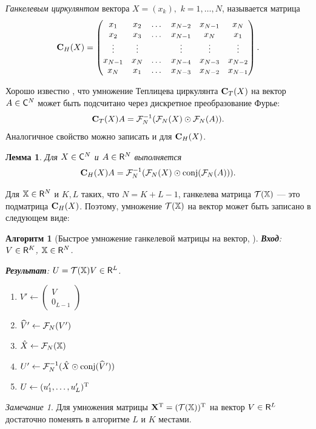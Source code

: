 \documentclass[12pt, specialist, subf,href,colorlinks=true,substylefile = spbu.rtx]{disser}
\newtheorem{algorithm}{Алгоритм}
\newtheorem{lemma}{Лемма}
\theoremstyle{remark}
\newtheorem{remark}{Замечание}
\theoremstyle{definition}
\begin{document}
\emph{Ганкелевым циркулянтом} вектора $X=(x_k),$ $k = 1, \ldots, N$, называется матрица
\begin{equation*}
\mathbf{C}_H(X) = \begin{pmatrix}
x_1 & x_2 & \dots & x_{N-2} & x_{N-1} & x_N \\ 
x_2 & x_3 & \dots & x_{N-1} & x_N & x_1 \\ 
\vdots & \vdots &  & \vdots  & \vdots & \vdots \\ 
x_{N-1} & x_N & \dots & x_{N-4} & x_{N-3} & x_{N-2} \\ 
x_N & x_1 & \dots & x_{N-3} & x_{N-2} & x_{N-1}
\end{pmatrix}.
\end{equation*}

Хорошо известно \cite{Korobeynikov2010}, что умножение Теплицева циркулянта $\mathbf{C}_T(X)$ на вектор $A \in \mathsf{C}^N$ может быть подсчитано через дискретное преобразование Фурье:
\begin{equation*}
\mathbf{C}_T(X) A = \mathcal{F}_N^{-1}(\mathcal{F}_N(X) \odot \mathcal{F}_N(A)).
\end{equation*}
Аналогичное свойство можно записать и для $\mathbf{C}_H(X)$.
\begin{lemma}{\cite{Golyandina2013}}
	Для $X \in \mathsf{C}^N$ и $A \in \mathsf{R}^N$ выполняется
	\begin{equation*}
	\mathbf{C}_H(X) A = \mathcal{F}_N^{-1}(\mathcal{F}_N(X) \odot \text{conj}(\mathcal{F}_N(A))).
	\end{equation*}
\end{lemma}

Для $\mathbb{X} \in \mathsf{R}^N$ и $K, L$ таких, что $N = K + L - 1$, ганкелева матрица $\mathcal{T}(\mathbb{X})$ --- это подматрица $\mathbf{C}_H(X)$. Поэтому, умножение $\mathcal{T}(\mathbb{X})$ на вектор может быть записано в следующем виде:

\begin{algorithm}[Быстрое умножение ганкелевой матрицы на вектор, \cite{Golyandina2013}]\label{fastprod}
	\textbf{Вход}: $V \in \mathsf{R}^K$, $\mathbb{X} \in \mathsf{R}^N$.
	
	\textbf{Результат}:
	$U = \mathcal{T}(\mathbb{X}) V \in \mathsf{R}^L$.
	
	\begin{enumerate}
		\item
		$V' \leftarrow \begin{pmatrix}
		V \\ 
		0_{L - 1}
		\end{pmatrix} $
		\item
		$\widehat V' \leftarrow \mathcal{F}_N(V')$
		\item
		$\hat X \leftarrow \mathcal{F}_N(\mathbb{X})$
		\item
		$U' \leftarrow \mathcal{F}_N^{-1}(\hat X \odot \text{conj}(\widehat V'))$
		\item
		$U \leftarrow (u'_1, \ldots, u'_L)^{\mathrm{T}}$
	\end{enumerate}
\end{algorithm}
\begin{remark}
	Для умножения матрицы $\mathbf{X}^{\mathrm{T}} = (\mathcal{T}(\mathbb{X}))^{\mathrm{T}}$ на вектор $V \in \mathsf{R}^L$ достаточно поменять в алгоритме $L$ и $K$ местами.
\end{remark}
\end{document}
